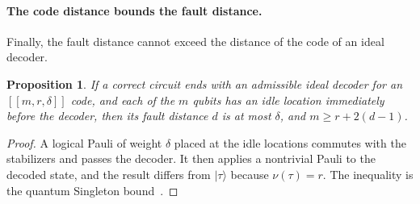 \documentclass[aps,prl,reprint,twocolumn,amsmath,amssymb,floatfix,nofootinbib,superscriptaddress]{revtex4-2}
\newtheorem{proposition}[theorem]{Proposition}
\theoremstyle{definition}
\theoremstyle{remark}
\begin{document}
\paragraph*{The code distance bounds the fault distance.}
Finally, the fault distance cannot exceed the distance of the code of an ideal decoder.
\begin{proposition}\label{prop:singleton}
If a correct circuit ends with an admissible ideal decoder for an $[[m,r,\delta]]$ code, and each of the $m$ qubits has an idle location immediately before the decoder, then its fault distance $d$ is at most $\delta$, and $m\geq r+2(d-1)$.
\end{proposition}
\begin{proof}
A logical Pauli of weight $\delta$ placed at the idle locations commutes with the stabilizers and passes the decoder. It then applies a nontrivial Pauli to the decoded state, and the result differs from $|\tau\rangle$ because $\nu(\tau)=r$. The inequality is the quantum Singleton bound~\cite{knilllaflamme}.
\end{proof}
\end{document}
